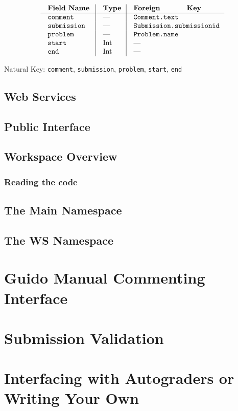 $$\vbox{
  \offinterlineskip
  \halign{
    \strut \quad {\tt #}  & \vrule\quad #  & \vrule\quad # \cr
    {\bf Field Name}  & {\bf Type}  & {\bf Foreign Key}\cr
    \noalign{\hrule}    
    comment  & ---  & {\tt Comment.text} \cr
    submission & --- & {\tt Submission.submissionid} \cr
    problem  & ---  & {\tt Problem.name} \cr
    start  & Int  & --- \cr
    end  & Int  & --- \cr
  }
}$$

{\noindent
Natural Key: {\tt comment}, {\tt submission}, 
{\tt problem}, {\tt start}, {\tt end}\par}

\section{Web Services}

\section{Public Interface}

\section{Workspace Overview}

\subsection{Reading the code}

\section{The Main Namespace}

\section{The WS Namespace}

\chapter{Guido Manual Commenting Interface}

\chapter{Submission Validation}

\chapter{Interfacing with Autograders or Writing Your Own}

